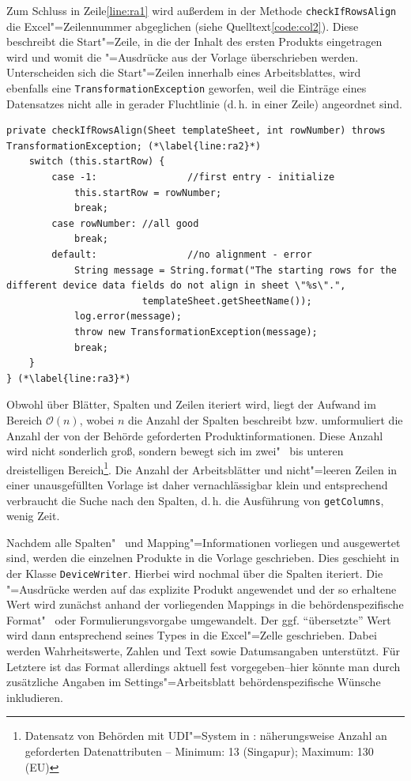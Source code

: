 Zum Schluss in Zeile\nbs\ref{line:ra1} wird außerdem in der Methode \texttt{checkIfRowsAlign} die Excel"=Zeilennummer abgeglichen (siehe Quelltext\nbs\ref{code:col2}). Diese beschreibt die Start"=Zeile, in die der Inhalt des ersten Produkts eingetragen wird und womit die "=Ausdrücke aus der Vorlage überschrieben werden. Unterscheiden sich die Start"=Zeilen innerhalb eines Arbeitsblattes, wird ebenfalls eine \texttt{TransformationException} geworfen, weil die Einträge eines Datensatzes nicht alle in gerader Fluchtlinie (d.\,h. in einer Zeile) angeordnet sind.

\begin{lstlisting}[emph={columns, templateSheet, jmesPath, startRow, mandatory, row, cell, cellValue, message, e, column, colLetter, rowNumber, expression, log},
caption=Hilfsfunktion beim Einlesen der Spalteninformationen, label=code:col2]
private checkIfRowsAlign(Sheet templateSheet, int rowNumber) throws TransformationException; (*\label{line:ra2}*)
	switch (this.startRow) {
		case -1:				//first entry - initialize
			this.startRow = rowNumber;
			break;
		case rowNumber:	//all good
			break;
		default:				//no alignment - error
			String message = String.format("The starting rows for the different device data fields do not align in sheet \"%s\".",
						templateSheet.getSheetName());
			log.error(message);
			throw new TransformationException(message);
			break;
	}
} (*\label{line:ra3}*)
\end{lstlisting}

Obwohl über Blätter, Spalten und Zeilen iteriert wird, liegt der Aufwand im Bereich $\mathcal{O}(n)$, wobei $n$ die Anzahl der Spalten beschreibt bzw. umformuliert die Anzahl der von der Behörde geforderten Produktinformationen. Diese Anzahl wird nicht sonderlich groß, sondern bewegt sich im zwei"~ bis unteren dreistelligen Bereich\footnote{Datensatz von Behörden mit UDI"=System in \cite{udi:timelines}: näherungsweise Anzahl an geforderten Datenattributen -- Minimum: 13 (Singapur); Maximum: 130 (EU)}. Die Anzahl der Arbeitsblätter und nicht"=leeren Zeilen in einer unausgefüllten Vorlage ist daher vernachlässigbar klein und entsprechend verbraucht die Suche nach den Spalten, d.\,h. die Ausführung von \texttt{getColumns}, wenig Zeit. 

Nachdem alle Spalten"~ und Mapping"=Informationen vorliegen und ausgewertet sind, werden die einzelnen Produkte in die Vorlage geschrieben. Dies geschieht in der Klasse \texttt{DeviceWriter}. Hierbei wird nochmal über die Spalten iteriert. Die "=Ausdrücke werden auf das explizite Produkt angewendet und der so erhaltene Wert wird zunächst anhand der vorliegenden Mappings in die behördenspezifische Format"~ oder Formulierungsvorgabe umgewandelt. Der ggf. "`übersetzte"' Wert wird dann entsprechend seines Types in die Excel"=Zelle geschrieben. Dabei werden Wahrheitswerte, Zahlen und Text sowie Datumsangaben unterstützt. Für Letztere ist das Format allerdings aktuell fest vorgegeben\nbs --\nbs hier könnte man durch zusätzliche Angaben im Settings"=Arbeitsblatt behördenspezifische Wünsche inkludieren. 

